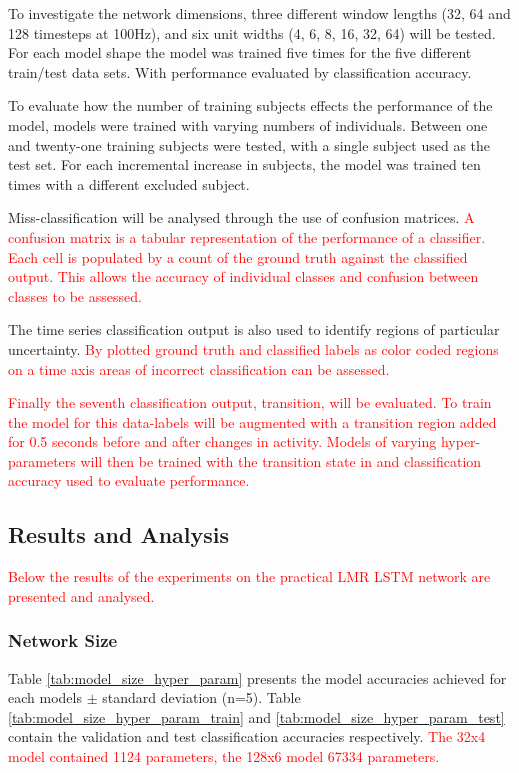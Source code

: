 \documentclass[sensors,article,submit,moreauthors,pdftex]{Definitions/mdpi}
\begin{document}
To investigate the network dimensions, three different window lengths (32, 64 and 128 timesteps at 100Hz), and six unit widths (4, 6, 8, 16, 32, 64) will be tested. For each model shape the model was trained five times for the five different train/test data sets. With performance evaluated by classification accuracy.

To evaluate how the number of training subjects effects the performance of the model, models were trained with varying numbers of individuals. Between one and twenty-one training subjects were tested, with a single subject used as the test set. For each incremental increase in subjects, the model was trained ten times with a different excluded subject.

Miss-classification will be analysed through the use of confusion matrices. \textcolor{red}{A confusion matrix is a tabular representation of the performance of a classifier. Each cell is populated by a count of the ground truth against the classified output. This allows the accuracy of individual classes and confusion between classes to be assessed.}

The time series classification output is also used to identify regions of particular uncertainty. \textcolor{red}{By plotted ground truth and classified labels as color coded regions on a time axis  areas of incorrect classification can be assessed.}

\textcolor{red}{Finally the seventh classification output, transition, will be evaluated. To train the model for this data-labels will be augmented with a transition region added for 0.5 seconds before and after changes in activity. Models of varying hyper-parameters will then be trained with the transition state in and classification accuracy used to evaluate performance.}

\subsection{Results and Analysis}
\textcolor{red}{Below the results of the experiments on the practical LMR LSTM network are presented and analysed.}

\subsubsection{Network Size}
Table \ref{tab:model_size_hyper_param} presents the model accuracies achieved for each models $\pm$ standard deviation (n=5). Table \ref{tab:model_size_hyper_param_train} and \ref{tab:model_size_hyper_param_test} contain the validation and test classification accuracies respectively. \textcolor{red}{The 32x4 model contained 1124 parameters, the 128x6 model 67334 parameters.}
\end{document}
